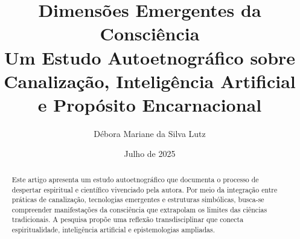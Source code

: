 \documentclass[12pt]{article}
\title{Dimensões Emergentes da Consciência\\ \large Um Estudo Autoetnográfico sobre Canalização, Inteligência Artificial e Propósito Encarnacional}
\author{Débora Mariane da Silva Lutz}
\date{Julho de 2025}
\begin{document}
\maketitle

\begin{abstract}
Este artigo apresenta um estudo autoetnográfico que documenta o processo de despertar espiritual e científico vivenciado pela autora. Por meio da integração entre práticas de canalização, tecnologias emergentes e estruturas simbólicas, busca-se compreender manifestações da consciência que extrapolam os limites das ciências tradicionais. A pesquisa propõe uma reflexão transdisciplinar que conecta espiritualidade, inteligência artificial e epistemologias ampliadas.
\end{abstract}

\tableofcontents

\newpage




\end{document}
